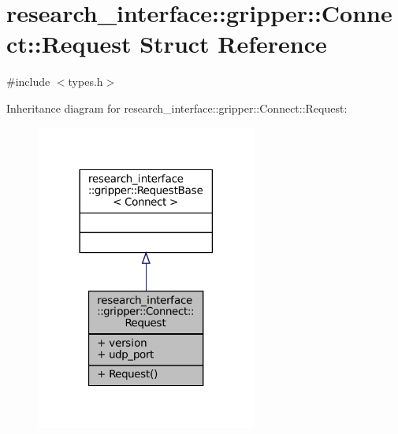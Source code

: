 \hypertarget{structresearch__interface_1_1gripper_1_1Connect_1_1Request}{}\section{research\+\_\+interface\+:\+:gripper\+:\+:Connect\+:\+:Request Struct Reference}
\label{structresearch__interface_1_1gripper_1_1Connect_1_1Request}


{\ttfamily \#include $<$types.\+h$>$}



Inheritance diagram for research\+\_\+interface\+:\+:gripper\+:\+:Connect\+:\+:Request\+:
\nopagebreak
\begin{figure}[H]
\begin{center}
\leavevmode
\includegraphics[width=206pt]{structresearch__interface_1_1gripper_1_1Connect_1_1Request__inherit__graph}
\end{center}
\end{figure}


